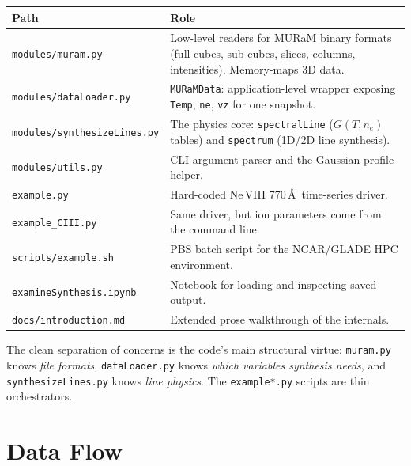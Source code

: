 \documentclass[11pt]{article}
\newcommand{\code}[1]{\texttt{#1}}
\begin{document}
\begin{center}
\small
\begin{tabular}{@{}lp{10.6cm}@{}}
\toprule
\textbf{Path} & \textbf{Role} \\
\midrule
\code{modules/muram.py} & Low-level readers for MURaM binary formats (full cubes, sub-cubes, slices, columns, intensities). Memory-maps 3D data. \\
\code{modules/dataLoader.py} & \code{MURaMData}: application-level wrapper exposing \code{Temp}, \code{ne}, \code{vz} for one snapshot. \\
\code{modules/synthesizeLines.py} & The physics core: \code{spectralLine} ($G(T,n_e)$ tables) and \code{spectrum} (1D/2D line synthesis). \\
\code{modules/utils.py} & CLI argument parser and the Gaussian profile helper. \\
\code{example.py} & Hard-coded Ne\,VIII 770\,\AA\ time-series driver. \\
\code{example\_CIII.py} & Same driver, but ion parameters come from the command line. \\
\code{scripts/example.sh} & PBS batch script for the NCAR/GLADE HPC environment. \\
\code{examineSynthesis.ipynb} & Notebook for loading and inspecting saved output. \\
\code{docs/introduction.md} & Extended prose walkthrough of the internals. \\
\bottomrule
\end{tabular}
\end{center}

\noindent The clean separation of concerns is the code's main structural virtue:
\code{muram.py} knows \emph{file formats}, \code{dataLoader.py} knows \emph{which
variables synthesis needs}, and \code{synthesizeLines.py} knows \emph{line
physics}. The \code{example*.py} scripts are thin orchestrators.

\section{Data Flow}
\end{document}
